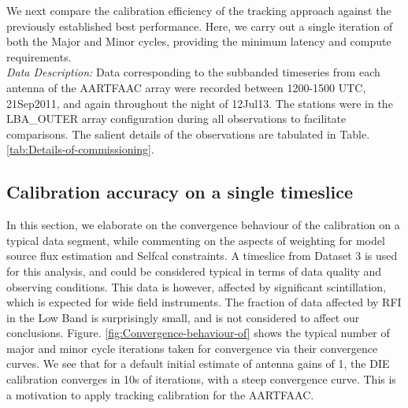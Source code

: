 \documentclass{aa}
\begin{document}
We next compare the calibration efficiency of the tracking approach
against the previously established best performance. Here, we carry
out a single iteration of both the Major and Minor cycles, providing
the minimum latency and compute requirements.\\
\emph{Data Description: }Data corresponding to the subbanded timeseries
from each antenna of the AARTFAAC array were recorded between 1200-1500
UTC, 21Sep2011, and again throughout the night of 12Jul13. The stations
were in the LBA\_OUTER array configuration during all observations
to facilitate comparisons. The salient details of the observations
are tabulated in Table. \ref{tab:Details-of-commissioning}.

\begin{table}[tbh]

\caption{\label{tab:Details-of-commissioning}Details of commissioning observations
carried out with the AARTFAAC }
\end{table}



\subsection{Calibration accuracy on a single timeslice}

In this section, we elaborate on the convergence behaviour of the
calibration on a typical data segment, while commenting on the aspects
of weighting for model source flux estimation and Selfcal constraints.
A timeslice from Dataset 3 is used for this analysis, and could be
considered typical in terms of data quality and observing conditions.
This data is however, affected by significant scintillation, which
is expected for wide field instruments. The fraction of data affected
by RFI in the Low Band is surprisingly small\cite{offringa2012lofar},
and is not considered to affect our conclusions. Figure. \ref{fig:Convergence-behaviour-of}
shows the typical number of major and minor cycle iterations taken
for convergence via their convergence curves. We see that for a default
initial estimate of antenna gains of 1, the DIE calibration converges
in 10s of iterations, with a steep convergence curve. This is a motivation
to apply tracking calibration for the AARTFAAC.
\end{document}
